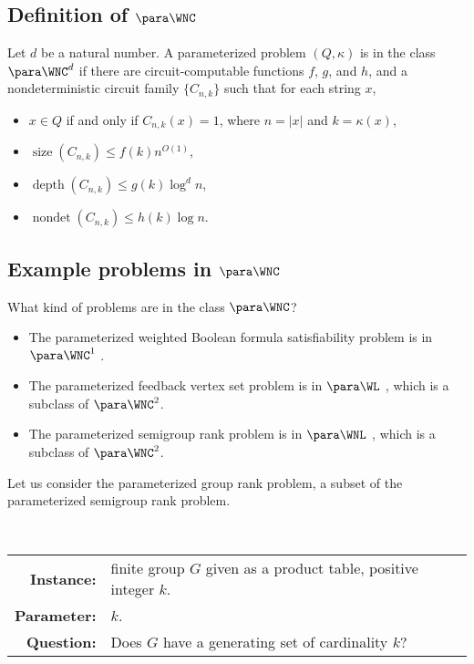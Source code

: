 \documentclass{article}
\newcommand{\dash}{\textnormal{-}}
\newcommand{\pgrouprank}{p\dash\textsc{Group Rank}}
\DeclareMathOperator{\depth}{depth}
\DeclareMathOperator{\nondet}{nondet}
\DeclareMathOperator{\size}{size}
\begin{document}
\subsection{Definition of \texorpdfstring{$\para \WNC$}{paraWNC}}

\begin{definition}
  Let $d$ be a natural number.
  A parameterized problem $(Q, \kappa)$ is in the class $\para \WNC^d$ if there are circuit-computable functions $f$, $g$, and $h$, and a nondeterministic circuit family $\{C_{n, k}\}$ such that for each string $x$,
  \begin{itemize}
  \item $x \in Q$ if and only if $C_{n, k}(x) = 1$, where $n = |x|$ and $k = \kappa(x)$,
  \item $\size(C_{n, k}) \leq f(k) n^{O(1)}$,
  \item $\depth(C_{n, k}) \leq g(k) \log^d n$,
  \item $\nondet(C_{n, k}) \leq h(k) \log n$.
  \end{itemize}
\end{definition}

\subsection{Example problems in \texorpdfstring{$\para \WNC$}{paraWNC}}
\label{sec:rankinwp}

What kind of problems are in the class $\para \WNC$?

\begin{itemize}
\item The parameterized weighted Boolean formula satisfiability problem is in $\para \WNC^1$ \autocite[Theorem~3.6]{est15}.
\item The parameterized feedback vertex set problem is in $\para \WL$ \autocite[Section~4.3]{est15}, which is a subclass of $\para \WNC^2$.
\item The parameterized semigroup rank problem is in $\para \WNL$ \autocite[Theorem~3.12]{est15}, which is a subclass of $\para \WNC^2$.
\end{itemize}

Let us consider the parameterized group rank problem, a subset of the parameterized semigroup rank problem.

\begin{definition}[$\pgrouprank$]
  \mbox{} \\
  \begin{tabular}{r p{9.2cm}}
    \textbf{Instance:} & finite group $G$ given as a product table, positive integer $k$. \\
    \textbf{Parameter:} & $k$. \\
    \textbf{Question:} & Does $G$ have a generating set of cardinality $k$?
  \end{tabular}
\end{definition}
\end{document}
